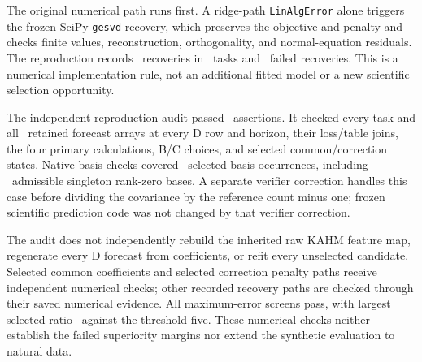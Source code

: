 The original numerical path runs first. A ridge-path
\texttt{LinAlgError} alone triggers the frozen SciPy \texttt{gesvd}
recovery, which preserves the objective and penalty and checks finite
values, reconstruction, orthogonality, and normal-equation residuals.
The reproduction records \CFRSVDRecoveries\ recoveries in
\CFRRecoveryTasks\ tasks and \CFRSVDFailures\ failed recoveries.
This is a numerical implementation rule, not an additional fitted model
or a new scientific selection opportunity.

The independent reproduction audit passed \CFRAuditAssertions\
assertions. It checked every task and all \CFRAuditArrays\ retained
forecast arrays at every D row and horizon, their loss/table joins, the
four primary calculations, B/C choices, and selected common/correction
states. Native basis checks covered \CFRAuditBases\ selected basis
occurrences, including \CFRZeroRanks\ admissible singleton rank-zero
bases. A separate verifier correction handles this case before dividing
the covariance by the reference count minus one; frozen scientific
prediction code was not changed by that verifier correction.

The audit does not independently rebuild the inherited raw KAHM feature
map, regenerate every D forecast from coefficients, or refit every
unselected candidate. Selected common coefficients and selected correction
penalty paths receive independent numerical checks; other recorded recovery
paths are checked through their saved numerical evidence. All maximum-error
screens pass, with largest selected ratio \CFRMaxErrorRatio\ against
the threshold five. These numerical checks neither establish the failed
superiority margins nor extend the synthetic evaluation to natural data.

